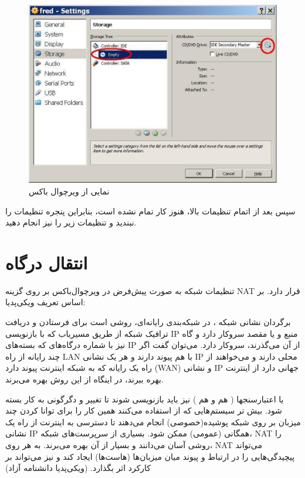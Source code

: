 \begin{figure}
    \includegraphics[width=.9\textwidth ,height=.65\textwidth]{Pic/VBox3}
    \caption{ نمایی از ویرچوال باکس}
    \label{VBOX3}
\end{figure}
سپس بعد از اتمام تنظیمات بالا، هنوز کار تمام نشده است، بنابراین پنجره تنظیمات را نبندید و تنظیمات زیر را نیز انجام دهید.

\section{انتقال درگاه 
    }
تنظیمات شبکه به صورت پیش‌فرض در ویرچوال‌باکس بر روی گزینه NAT قرار دارد.  بر اساس تعریف ویکی‌پدیا:

برگردان نشانی شبکه 
، در شبکه‌بندی رایانه‌ای، روشی است برای فرستادن و دریافت ترافیک شبکه از طریق مسیریاب که با بازنویسی IP منبع و یا مقصد سروکار دارد و گاه نیز با شماره درگاه‌های 
که بسته‌های IP از آن می‌گذرند، سروکار دارد. می‌توان گفت اگر چند رایانه از راه LAN با هم پیوند دارند و هر یک نشانی IP محلی دارند و می‌خواهند از راه یک رایانه که به شبکه اینترنت پیوند دارد (WAN) و نشانی IP جهانی دارد از اینترنت بهره ببرند، در اینگاه از این روش بهره می‌برند.

 یا اعتبارسنجها
 (
هم
  و هم
 )
 نیز باید بازنویسی شوند تا تغییر و دگرگونی به کار بسته شود. بیش تر سیستم‌هایی که از 
  استفاده می‌کنند همین کار را برای توانا کردن چند میزبان بر روی شبکه پوشیده(خصوصی) انجام می‌دهند تا دسترسی به اینترنت از راه یک نشانی IP همگانی (عمومی) ممکن شود. بسیاری از سرپرست‌های شبکه، NAT را روشی آسان می‌دانند و بسیار از آن بهره می‌برند. به هر روی، NAT می‌تواند پیچیدگی‌هایی را در ارتباط و پیوند میان میزبان‌ها (هاست‌ها) ایجاد کند و نیز می‌تواند بر کارکرد اثر بگذارد. (ویکی‌پدیا دانشنامه آزاد)

